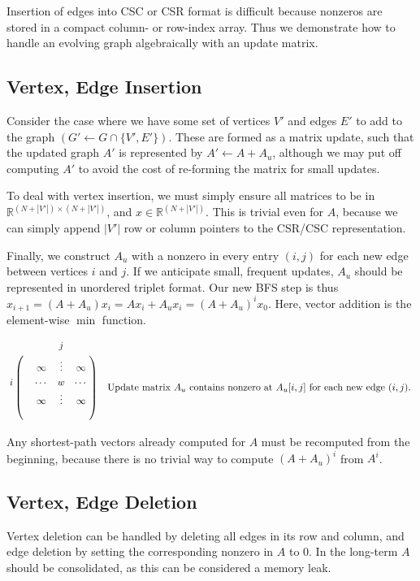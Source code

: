 \documentclass[11pt]{article}
\begin{document}
Insertion of edges into CSC or CSR format is difficult because nonzeros are stored in a compact column- or row-index array. Thus we demonstrate how to handle an evolving graph algebraically with an update matrix. 

\subsection{Vertex, Edge Insertion}
Consider the case where we have some set of vertices $V'$ and edges $E'$ to add to the graph $(G' \gets G \cap \{V',E'\})$. These are formed as a matrix update, such that the updated graph $A'$ is represented by $A' \gets A + A_u$, although we may put off computing $A'$ to avoid the cost of re-forming the matrix for small updates.

To deal with vertex insertion, we must simply ensure all matrices to be in $\mathbb{R}^{(N+|V'|)\times(N+|V'|)}$, and $x \in \mathbb{R}^{(N+|V'|)}$. This is trivial even for $A$, because we can simply append $|V'|$ row or column pointers to the CSR/CSC representation.

Finally, we construct $A_u$ with a nonzero in every entry $(i,j)$ for each new edge between vertices $i$ and $j$. If we anticipate small, frequent updates, $A_u$ should be represented in unordered triplet format. Our new BFS step is thus $x_{i+1} = (A+A_u)x_i = Ax_i + A_ux_i = (A+A_u)^ix_0$. Here, vector addition is the element-wise $\min$ function.

\begin{align}\bordermatrix{ 
& & & j&  \cr
& & \infty & \vdots & \infty \cr
 i & &  \cdots & w & \cdots   \cr
  & & \infty & \vdots & \infty  \cr
   &  & & &  
} && \text{Update matrix $A_u$ contains nonzero at $A_u[i,j]$ for each new edge $(i,j)$. }\end{align}

Any shortest-path vectors already computed for $A$ must be recomputed from the beginning, because there is no trivial way to compute $(A+A_u)^i$ from $A^i$.



\subsection{Vertex, Edge Deletion}
Vertex deletion can be handled by deleting all edges in its row and column, and edge deletion by setting the corresponding nonzero in $A$ to 0. In the long-term $A$ should be consolidated, as this can be considered a memory leak. 
\end{document}
